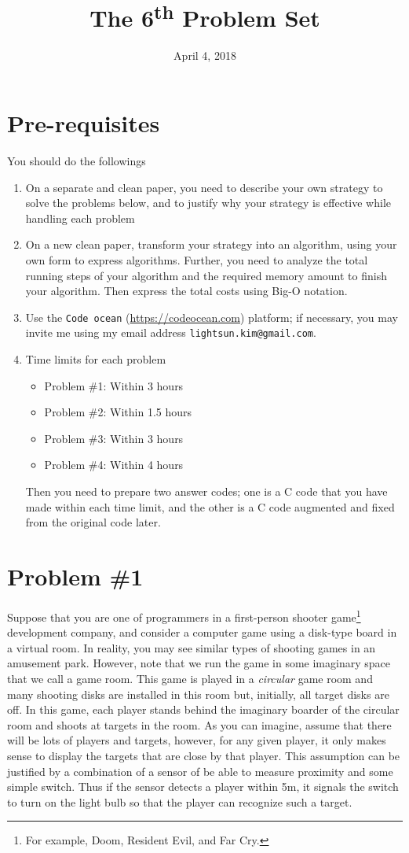 \documentclass{article}
\date{April 4, 2018}
\title{The 6\textsuperscript{th} Problem Set}
\begin{document}
\maketitle
\section*{Pre-requisites}
You should do the followings
\begin{enumerate}
\item On a separate and clean paper,  you need to describe your own strategy to solve the problems below, and 
	to justify why your strategy is effective while handling each problem
\item On a new clean paper, transform your strategy into an algorithm, using your own form to express algorithms.
	Further, you need to analyze the total running steps of your algorithm and the required memory amount to finish your algorithm.
	Then express the total costs using Big-O notation.
\item Use the \texttt{Code ocean} (\url{https://codeocean.com}) platform; if necessary, you may invite me using my email address 
\texttt{lightsun.kim@gmail.com}.
\item Time limits for each problem
\begin{itemize}
\item Problem \#1: Within 3 hours
\item Problem \#2: Within 1.5 hours
\item Problem \#3: Within 3 hours
\item Problem \#4: Within 4 hours
\end{itemize}
Then you need to prepare two answer codes; one is a C code that you have made within each time limit, and the
other is a C code augmented and fixed from the original code later.
\end{enumerate}

\newpage

\section*{Problem \#1}

Suppose that you are one of programmers in a first-person shooter game\footnote{For example, Doom, Resident Evil, and Far Cry.} development company, 
and consider a computer game using a disk-type board in a virtual room. 
In reality, you may see similar types of shooting games in an amusement park.
However, note that we run the game in some imaginary space that we call a game room.
This game is played in a \emph{circular} game room and many shooting disks are installed in this room but, initially, all target disks are  off.
In this game, each player stands behind the imaginary boarder of the circular room and shoots at targets in the room.
As you can imagine,  assume that there will be lots of players and targets, however,
for any given player, it only makes sense to display the targets that are close by that player.
This assumption can be justified by a combination of a sensor of be able to measure proximity and some simple switch.
Thus  if the sensor detects a player within 5m, it signals  the switch to turn on the light bulb so that 
the player can recognize such a target.
\end{document}
